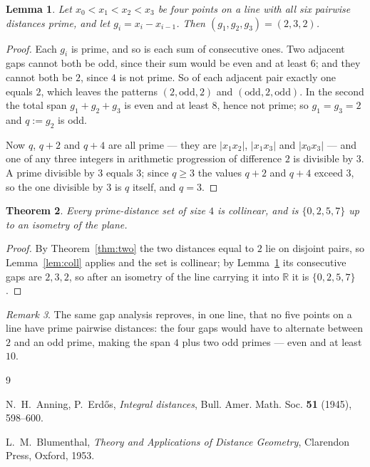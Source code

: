 \documentclass[11pt]{article}
\theoremstyle{plain}
\newtheorem{theorem}{Theorem}
\newtheorem{lemma}[theorem]{Lemma}
\theoremstyle{definition}
\theoremstyle{remark}
\newtheorem{remark}[theorem]{Remark}
\begin{document}
\begin{lemma}\label{lem:gaps}
Let $x_0<x_1<x_2<x_3$ be four points on a line with all six pairwise distances
prime, and let $g_i=x_i-x_{i-1}$. Then $(g_1,g_2,g_3)=(2,3,2)$.
\end{lemma}

\begin{proof}
Each $g_i$ is prime, and so is each sum of consecutive ones. Two adjacent gaps
cannot both be odd, since their sum would be even and at least $6$; and they
cannot both be $2$, since $4$ is not prime. So of each adjacent pair exactly one
equals $2$, which leaves the patterns $(2,\text{odd},2)$ and
$(\text{odd},2,\text{odd})$. In the second the total span $g_1+g_2+g_3$ is even
and at least $8$, hence not prime; so $g_1=g_3=2$ and $q:=g_2$ is odd.

Now $q$, $q+2$ and $q+4$ are all prime --- they are $|x_1x_2|$, $|x_1x_3|$ and
$|x_0x_3|$ --- and one of any three integers in arithmetic
progression of difference $2$ is divisible by $3$. A prime divisible by $3$
equals $3$; since $q\ge3$ the values $q+2$ and $q+4$ exceed $3$, so the one
divisible by $3$ is $q$ itself, and $q=3$. \end{proof}

\begin{theorem}
Every prime-distance set of size $4$ is collinear, and is $\{0,2,5,7\}$ up to an
isometry of the plane.
\end{theorem}

\begin{proof}
By Theorem~\ref{thm:two} the two distances equal to $2$ lie on disjoint pairs, so
Lemma~\ref{lem:coll} applies and the set is collinear; by Lemma~\ref{lem:gaps}
its consecutive gaps are $2,3,2$, so after an isometry of the line carrying it
into $\mathbb R$ it is $\{0,2,5,7\}$. \end{proof}

\begin{remark}
The same gap analysis reproves, in one line, that no five points on a line have
prime pairwise distances: the four gaps would have to alternate between $2$ and
an odd prime, making the span $4$ plus two odd primes --- even and at least
$10$.
\end{remark}

\begin{thebibliography}{9}

 N.~H.~Anning, P.~Erd\H os,
\emph{Integral distances},
Bull. Amer. Math. Soc. \textbf{51} (1945), 598--600.

 L.~M.~Blumenthal,
\emph{Theory and Applications of Distance Geometry},
Clarendon Press, Oxford, 1953.

\end{thebibliography}
\end{document}
